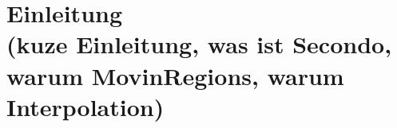 
\chapter[Einleitung]{Einleitung\\
\normalsize{(kuze Einleitung, was ist Secondo, warum MovinRegions, warum Interpolation)}} \label{Kapitel2}
\minitoc
\newpage